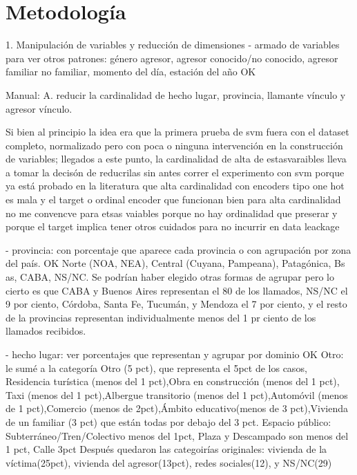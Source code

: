 \documentclass[10pt, spanish]{article}
\begin{document}
\section{Metodología}\label{met}


1. Manipulación de variables y reducción de dimensiones
- armado de variables para ver otros patrones: género agresor, agresor conocido/no conocido, agresor familiar no familiar, momento del día, estación del año OK

Manual:
A. reducir la cardinalidad de hecho lugar, provincia, llamante vínculo y agresor vínculo. 

Si bien al principio la idea era que la primera prueba de svm fuera con el dataset completo, normalizado pero con poca o ninguna intervención en la construcción de variables; llegados a este punto, la cardinalidad de alta de estasvaraibles lleva a tomar la decisón de reducrilas sin antes correr el experimento con svm porque ya está probado en la literatura que alta cardinalidad con encoders tipo one hot es mala y el target o ordinal encoder que funcionan bien para alta cardinalidad no me convencve para etsas vaiables porque no hay ordinalidad que preserar y porque el target implica tener otros cuidados para no incurrir en data leackage

- provincia: con porcentaje que aparece cada provincia o con agrupación por zona del país. OK
Norte (NOA, NEA), Central (Cuyana, Pampeana), Patagónica, Bs as, CABA, NS/NC. Se podrían haber elegido otras formas de agrupar pero lo cierto es que CABA y Buenos Aires representan el 80 de los llamados, NS/NC el 9 por ciento, Córdoba, Santa Fe, Tucumán, y Mendoza el 7 por ciento, y el resto de la provincias representan individualmente menos del 1 pr ciento de los llamados recibidos.

- hecho lugar: ver porcentajes que representan y agrupar por dominio OK
Otro: le sumé a la categoría Otro (5 pct), que representa el 5pct de los casos,  Residencia turística (menos del 1 pct),Obra en construcción (menos del 1 pct), Taxi (menos del 1 pct),Albergue transitorio (menos del 1 pct),Automóvil (menos de 1 pct),Comercio (menos de 2pct),Ámbito educativo(menos de 3 pct),Vivienda de un familiar (3 pct) que están todas por debajo del 3 pct.
Espacio público: Subterráneo/Tren/Colectivo menos del 1pct, Plaza y Descampado son menos del 1 pct, Calle 3pct
Después quedaron las categoirías originales: vivienda de la víctima(25pct), vivienda del agresor(13pct), redes sociales(12), y NS/NC(29)
\end{document}
